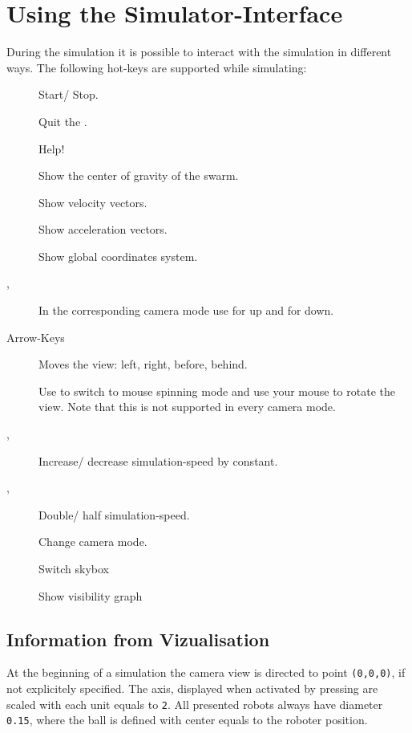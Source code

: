 \section{Using the Simulator-Interface}
During the simulation it is possible to interact with the simulation in different ways. The following hot-keys are supported while simulating:

\begin{description}
	\item [] Start/ Stop.
	\item [] Quit the \RSS.
	\item [] Help!
	\item [] Show the center of gravity of the swarm.
	\item [] Show velocity vectors.
	\item [] Show acceleration vectors.
	\item [] Show global coordinates system.
	\item [,] In the corresponding camera mode use  for up  and  for down.
	\item [Arrow-Keys] Moves the view: left, right, before, behind.
	\item [] Use  to switch to mouse spinning mode and use your mouse to rotate the view. Note that this is not supported in every camera mode.
	\item [\fbox{\tt +}, \fbox{\tt -}] Increase/ decrease simulation-speed by constant.
	\item [\fbox{\tt *},\fbox{\tt /}] Double/ half simulation-speed.
	\item [] Change camera mode.
	\item [] Switch skybox
	\item [] Show visibility graph
\end{description}

\subsection{Information from Vizualisation}
At the beginning of a simulation the camera view is directed to point \texttt{(0,0,0)}, if not explicitely specified. The axis, displayed when activated by pressing  are scaled with each unit equals to \texttt{2}. All presented robots always have diameter \texttt{0.15}, where the ball is defined with center equals to the roboter position.

